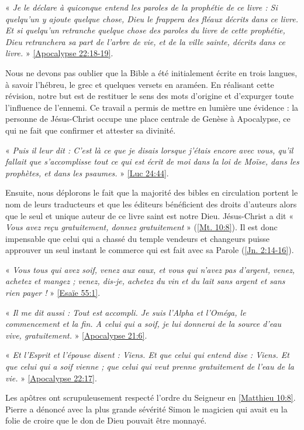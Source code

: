 « \emph{Je le déclare à quiconque entend les paroles de la prophétie de ce livre : Si quelqu'un y ajoute quelque chose, Dieu le frappera des fléaux décrits dans ce livre.  Et si quelqu'un retranche quelque chose des paroles du livre de cette prophétie, Dieu retranchera sa part de l’arbre de vie, et de la ville sainte, décrits dans ce livre.} » \vref{Apocalypse 22:18-19}.

Nous ne devons pas oublier que la Bible a été initialement écrite en trois langues,  à savoir l’hébreu, le grec et quelques versets en araméen. En réalisant cette révision, notre but est de restituer le sens des mots d’origine et d’expurger toute l’influence de l’ennemi. Ce travail a permis de mettre en lumière une évidence : la personne de Jésus-Christ occupe une place centrale de Genèse à Apocalypse, ce qui ne fait que confirmer et attester sa divinité.

« \emph{Puis il leur dit : C’est là ce que je disais lorsque j’étais encore avec vous, qu’il fallait que s’accomplisse tout ce qui est écrit de moi dans la loi de Moïse, dans les prophètes, et dans les psaumes.} » \vref{Luc 24:44}.

Ensuite, nous déplorons le fait que la majorité des bibles en circulation portent le nom de leurs traducteurs et que les éditeurs bénéficient des droits d’auteurs alors que le seul et unique auteur de ce livre saint est notre Dieu. Jésus-Christ a dit « \emph{Vous avez reçu gratuitement, donnez gratuitement} » (\vref{Mt. 10:8}). Il est donc impensable que celui qui a chassé du temple vendeurs et changeurs puisse approuver un seul instant le commerce qui est fait avec sa Parole (\vref{Jn. 2:14-16}).

« \emph{Vous tous qui avez soif, venez aux eaux, et vous qui n'avez pas d'argent, venez, achetez et mangez ; venez, dis-je, achetez du vin et du lait sans argent et sans rien payer !} » \vref{Esaïe 55:1}.

« \emph{Il me dit aussi : Tout est accompli. Je suis l'Alpha et l'Oméga, le commencement et la fin. A celui qui a soif, je lui donnerai de la source d'eau vive, gratuitement.} » \vref{Apocalypse 21:6}.

« \emph{Et l'Esprit et l'épouse disent : Viens. Et que celui qui entend dise : Viens. Et que celui qui a soif vienne ; que celui qui veut prenne gratuitement de l'eau de la vie.} » \vref{Apocalypse 22:17}.

Les apôtres ont scrupuleusement respecté l’ordre du Seigneur en \vref{Matthieu 10:8}. Pierre a dénoncé avec la plus grande sévérité Simon le magicien qui avait eu la folie de croire que le don de Dieu pouvait être monnayé. 

